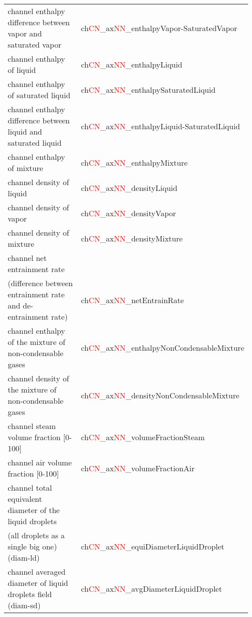 \begin{longtable}{|l|l|}
      channel enthalpy difference between vapor and saturated vapor & ch\textcolor{red}{CN}\_ax\textcolor{red}{NN}\_enthalpyVapor-SaturatedVapor \\
      channel enthalpy of liquid & ch\textcolor{red}{CN}\_ax\textcolor{red}{NN}\_enthalpyLiquid \\
      channel enthalpy of saturated liquid & ch\textcolor{red}{CN}\_ax\textcolor{red}{NN}\_enthalpySaturatedLiquid \\
      channel enthalpy difference between liquid and saturated liquid & ch\textcolor{red}{CN}\_ax\textcolor{red}{NN}\_enthalpyLiquid-SaturatedLiquid \\
      channel enthalpy of mixture & ch\textcolor{red}{CN}\_ax\textcolor{red}{NN}\_enthalpyMixture \\
      channel density of liquid  & ch\textcolor{red}{CN}\_ax\textcolor{red}{NN}\_densityLiquid \\
      channel density of vapor  & ch\textcolor{red}{CN}\_ax\textcolor{red}{NN}\_densityVapor \\
      channel density of mixture & ch\textcolor{red}{CN}\_ax\textcolor{red}{NN}\_densityMixture \\
      channel net entrainment rate & \\ (difference between entrainment rate and de-entrainment rate)  & ch\textcolor{red}{CN}\_ax\textcolor{red}{NN}\_netEntrainRate \\
      channel enthalpy of the mixture of non-condensable gases & ch\textcolor{red}{CN}\_ax\textcolor{red}{NN}\_enthalpyNonCondensableMixture \\
      channel density of the mixture of non-condensable gases & ch\textcolor{red}{CN}\_ax\textcolor{red}{NN}\_densityNonCondensableMixture \\
      channel steam volume fraction [0-100] & ch\textcolor{red}{CN}\_ax\textcolor{red}{NN}\_volumeFractionSteam \\
      channel air volume fraction [0-100] & ch\textcolor{red}{CN}\_ax\textcolor{red}{NN}\_volumeFractionAir \\
      channel total equivalent diameter of the liquid droplets & \\ (all droplets as a single big one) (diam-ld) & ch\textcolor{red}{CN}\_ax\textcolor{red}{NN}\_equiDiameterLiquidDroplet \\
      channel averaged diameter of liquid droplets field (diam-sd) & ch\textcolor{red}{CN}\_ax\textcolor{red}{NN}\_avgDiameterLiquidDroplet \\

\end{longtable}
